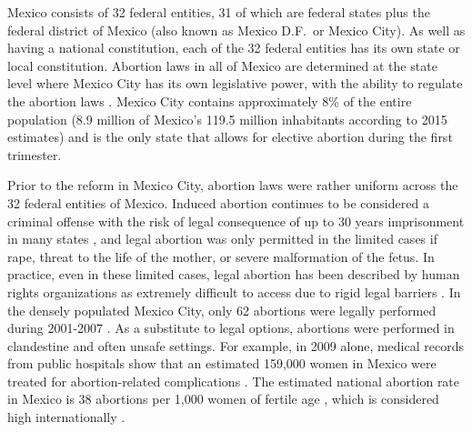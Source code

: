 \documentclass[a4paper, 11pt]{article}
\begin{document}
\begin{spacing}{2}
Mexico consists of 32 federal entities, 31 of which are federal states plus the federal district of Mexico (also known as Mexico D.F.\ or Mexico City).  As well as having a national constitution, each of the 32 federal entities has its own state or local constitution.  Abortion laws in all of Mexico are determined at the state level where Mexico City has its own legislative power, with the ability to regulate the abortion laws \citep{Becker2013}.  Mexico City contains approximately 8\% of the entire population (8.9 million of Mexico's 119.5 million inhabitants according to 2015 estimates) and is the only state that allows for elective abortion during the first trimester.

Prior to the reform in Mexico City, abortion laws were rather uniform across the 32 federal entities of Mexico.  Induced abortion continues to be considered a criminal offense with the risk of legal consequence of up to 30 years imprisonment in many states \citep{GIRE2009}, and legal abortion was only permitted in the limited cases if rape, threat to the life of the mother, or severe malformation of the fetus.  In practice, even in these limited cases, legal abortion has been described by human rights organizations as extremely difficult to access due to rigid legal barriers \citep{GIRE2009}. In the densely populated Mexico City, only 62 abortions were legally performed during 2001-2007 \citep{Becker2013}. As a substitute to legal options, abortions were performed in clandestine and often unsafe settings. For example, in 2009 alone, medical records from public hospitals show that an estimated 159,000 women in Mexico were treated for abortion-related complications \citep{GIRE2009}.  The estimated national abortion rate in Mexico is 38 abortions per 1,000 women of fertile age \citep{GIRE2009}, which is considered high internationally \citep{Becker2013}. 


\end{spacing}
\end{document}
